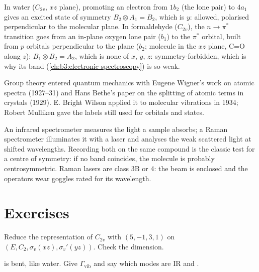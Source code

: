\begin{example}\label{ex:b3:group-theory-applied:electronic}
In water ($C_{2v}$, $xz$ plane), promoting an electron from $1b_2$ (the lone pair)
to $4a_1$ gives an excited state of symmetry $B_2\otimes A_1 = B_2$, which is $y$:
allowed, polarised perpendicular to the molecular plane. In formaldehyde
($C_{2v}$), the $n\to\pi^*$ transition goes from an in-plane oxygen lone pair ($b_1$)
to the $\pi^*$ orbital, built from $p$ orbitals perpendicular to the plane
($b_2$; molecule in the $xz$ plane, C=O along $z$): $B_1\otimes B_2 = A_2$,
which is none of $x$, $y$, $z$: symmetry-forbidden, which is why its band
(\cref{ch:b3:electronic-spectroscopy}) is so weak.
\end{example}

\begin{history}
Group theory entered quantum mechanics with Eugene Wigner's work on atomic
spectra (1927--31) and Hans Bethe's paper on the splitting of atomic terms in
crystals (1929). E. Bright Wilson applied it to molecular vibrations in
1934; Robert Mulliken gave the labels still used for orbitals and states.
\end{history}

\begin{inthelab}
An infrared spectrometer measures the light a sample absorbs; a Raman
spectrometer illuminates it with a laser and analyses the weak scattered
light at shifted wavelengths. Recording both on the same compound is the
classic test for a centre of symmetry: if no band coincides, the molecule is
probably centrosymmetric. Raman lasers are class 3B or 4: the beam is
enclosed and the operators wear goggles rated for its wavelength.
\end{inthelab}

\section{Exercises}

\begin{exercise}[$\star$]\label{exo:b3:group-theory-applied:1}
Reduce the representation of $C_{2v}$ with  $(5, -1, 3, 1)$ on $(E, C_2,
\sigma_v(xz), \sigma_v'(yz))$. Check the dimension.
\end{exercise}

\begin{exercise}[$\star$]\label{exo:b3:group-theory-applied:2}
 is bent, like water. Give $\Gamma_{\mathrm{vib}}$ and say which modes are IR
and .
\end{exercise}

